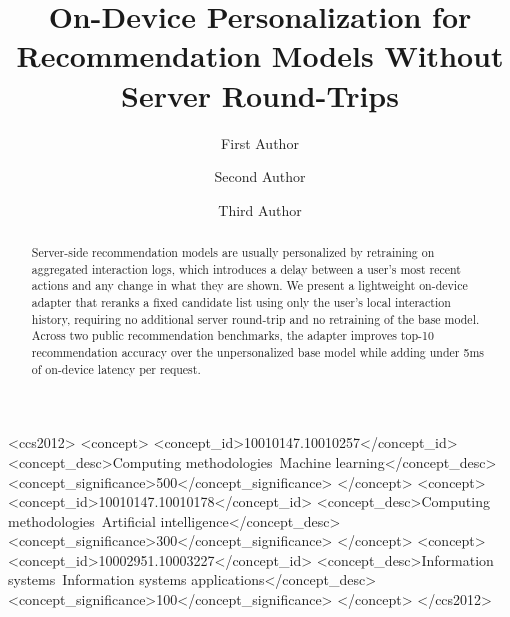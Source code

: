 \documentclass[sigconf]{acmart}
\begin{document}
\title{On-Device Personalization for Recommendation Models Without Server Round-Trips}

\author{First Author}

\author{Second Author}

\author{Third Author}

\renewcommand{\shortauthors}{First Author et al.}

\begin{abstract}
Server-side recommendation models are usually personalized by retraining on aggregated interaction logs, which introduces a delay between a user's most recent actions and any change in what they are shown. We present a lightweight on-device adapter that reranks a fixed candidate list using only the user's local interaction history, requiring no additional server round-trip and no retraining of the base model. Across two public recommendation benchmarks, the adapter improves top-10 recommendation accuracy over the unpersonalized base model while adding under 5ms of on-device latency per request.
\end{abstract}

\begin{CCSXML}
<ccs2012>
<concept>
<concept_id>10010147.10010257</concept_id>
<concept_desc>Computing methodologies~Machine learning</concept_desc>
<concept_significance>500</concept_significance>
</concept>
<concept>
<concept_id>10010147.10010178</concept_id>
<concept_desc>Computing methodologies~Artificial intelligence</concept_desc>
<concept_significance>300</concept_significance>
</concept>
<concept>
<concept_id>10002951.10003227</concept_id>
<concept_desc>Information systems~Information systems applications</concept_desc>
<concept_significance>100</concept_significance>
</concept>
</ccs2012>
\end{CCSXML}

\end{document}
